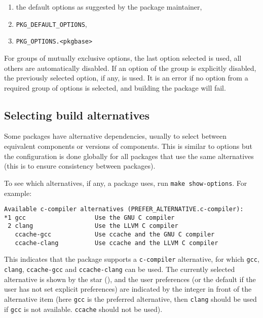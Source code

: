 \begin{enumerate}
   \item the default options as suggested by the package maintainer,

   \item {\tt PKG\_DEFAULT\_OPTIONS},

   \item {\tt PKG\_OPTIONS.<pkgbase>}
\end{enumerate}

For groups of mutually exclusive options, the last option selected is used, all
others are automatically  disabled.  If  an option of  the  group is explicitly
disabled, the previously selected option,  if any, is used.   It is an error if
no option from  a  required group  of  options is  selected, and  building  the
package will fail.


\subsection{Selecting build alternatives} %
\label{section:configuring:alternatives}

Some  packages  have  alternative   dependencies,  usually  to  select  between
equivalent components or versions of components. This is similar to options but
the  configuration  is  done  globally  for  all packages  that  use  the  same
alternatives (this is to ensure consistency between packages).

To see   which alternatives, if  any, a   package uses, run {\tt make
show-options}. For example:
\begin{verbatim}
Available c-compiler alternatives (PREFER_ALTERNATIVE.c-compiler):
*1 gcc                   Use the GNU C compiler
 2 clang                 Use the LLVM C compiler
   ccache-gcc            Use ccache and the GNU C compiler
   ccache-clang          Use ccache and the LLVM C compiler
\end{verbatim}
This indicates  that the package  supports a {\tt c-compiler}  alternative, for
which {\tt  gcc}, {\tt clang}, {\tt  ccache-gcc} and {\tt  ccache-clang} can be
used. The  currently selected alternative is  shown by the star  ({\tt *}), and
the  user  preferences  (or the  default  if  the  user  has not  set  explicit
preferences) are indicated by the integer in front of the alternative item
(here {\tt gcc} is the preferred alternative, then {\tt clang} should be used
if {\tt gcc} is not available. {\tt ccache} should not be used).

